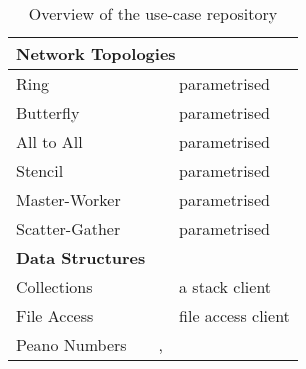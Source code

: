 \begin{table}[!h]
\begin{center}
\begin{tabular}{|l|l|l|l|}
	\hline
	\hline
	\multicolumn{4}{|l|}{ \textbf{Network Topologies}}
	\\
	\hline
	Ring & \cite{BerkleyPar} & \MPI & parametrised
	\\
	Butterfly & \cite{BerkleyPar} & \MPI & parametrised
	\\
	All to All & \cite{BerkleyPar} & \MPI & parametrised
	\\
	Stencil & \cite{BerkleyPar} & \MPI & parametrised
	\\
	Master-Worker & \cite{BerkleyPar} & \MPI & parametrised
	\\
	Scatter-Gather & \cite{BerkleyPar} & \MPI & parametrised
	\\
	
	\hline
	\hline
	\multicolumn{4}{|l|}{ \textbf{Data Structures}}
	\\
	\hline
	Collections & \cite{mungo} & \TypeState  & a stack client
	\\
	File Access & \cite{mungo} & \TypeState & file access client
	\\
	Peano Numbers & \cite{citation_needed} & \GV, \Links &
	\\
	\hline
\end{tabular}
\end{center}
\caption{Overview of the use-case repository}
\label{table:use_cases_all}
\end{table}

